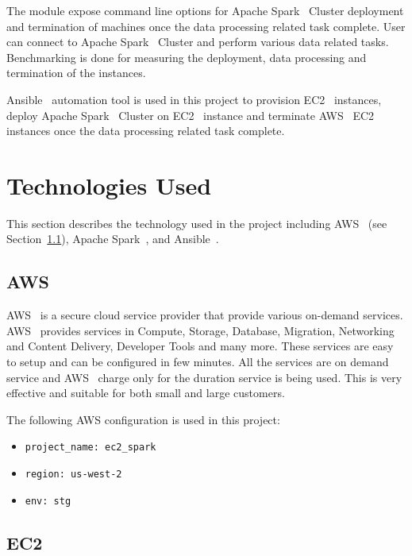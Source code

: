 The module expose command line options for Apache
Spark~\cite{hid-sp18-511-www-spark} Cluster deployment and termination
of machines once the data processing related task complete. User can
connect to Apache Spark~\cite{hid-sp18-511-www-spark} Cluster and
perform various data related tasks. Benchmarking is done for measuring
the deployment, data processing and termination of the instances.

Ansible~\cite{hid-sp18-511-www-ansible} automation tool is used in
this project to provision EC2~\cite{hid-sp18-511-www-ec2} instances,
deploy Apache Spark~\cite{hid-sp18-511-www-spark} Cluster on
EC2~\cite{hid-sp18-511-www-ec2} instance and terminate
AWS~\cite{hid-sp18-511-www-aws} EC2~\cite{hid-sp18-511-www-ec2}
instances once the data processing related task complete.

\section{Technologies Used}

This section describes the technology used in the project including
AWS~\cite{??} (see Section~\ref{S:aws}), Apache Spark~\cite{??}, and
Ansible~\cite{??}.

\subsection{AWS}\label{S:aws}

AWS~\cite{hid-sp18-511-www-aws} is a secure cloud service provider
that provide various on-demand services.
AWS~\cite{hid-sp18-511-www-aws} provides services in Compute, Storage,
Database, Migration, Networking and Content Delivery, Developer Tools
and many more. These services are easy to setup and can be configured
in few minutes. All the services are on demand service and
AWS~\cite{hid-sp18-511-www-aws} charge only for the duration service
is being used. This is very effective and suitable for both small and
large customers.

The following AWS configuration is used in this project:

\begin{itemize}
	\item \verb|project_name: ec2_spark|
	\item \verb|region: us-west-2|
	\item \verb|env: stg|
\end{itemize}


\subsection{EC2}

